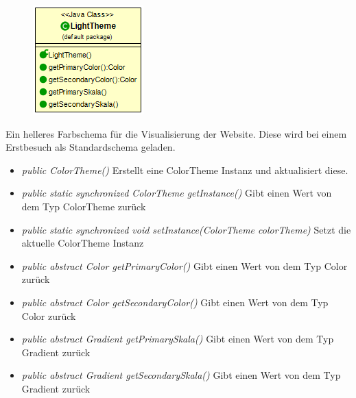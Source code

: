 \begin{itemize} [noitemsep]
\begin{minipage}{0.3\textwidth}
    \begin{figure}[H]
        \includegraphics[scale = 0.5
        ]{media/view/theme/LightTheme_Class.png}
    \end{figure}
    \end{minipage} \hfill
    \begin{minipage}{0.6\textwidth}
        Ein helleres Farbschema für die Visualisierung der Website. Diese wird bei einem Erstbesuch als Standardschema geladen.
    \end{minipage}
        
\begin{itemize} [noitemsep]
    \item \emph{public ColorTheme()} Erstellt eine ColorTheme Instanz und aktualisiert diese.
    \item \emph{public static synchronized ColorTheme getInstance()} Gibt einen Wert von dem Typ ColorTheme zurück
    \item \emph{public static synchronized void setInstance(ColorTheme colorTheme)} Setzt die aktuelle ColorTheme Instanz
    \item \emph{public abstract Color getPrimaryColor()} Gibt einen Wert von dem Typ Color zurück
    \item \emph{public abstract Color getSecondaryColor()} Gibt einen Wert von dem Typ Color zurück
    \item \emph{public abstract Gradient getPrimarySkala()} Gibt einen Wert von dem Typ Gradient zurück
    \item \emph{public abstract Gradient getSecondarySkala()}  Gibt einen Wert von dem Typ Gradient zurück
\end{itemize}


\end{itemize}

